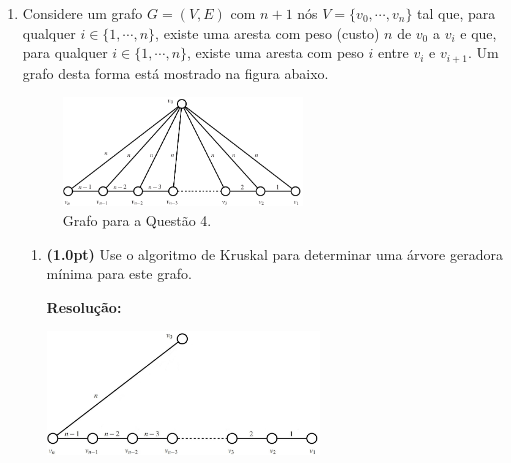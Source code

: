 \documentclass{article}
\begin{document}
\begin{enumerate}[resume*=exerc]
\item Considere um grafo $G = (V,E)$ com $n+1$ nós $V = \{v_0,\cdots,v_n\}$ tal que, para qualquer $i \in \{1,\cdots,n\}$, existe uma aresta com peso (custo) $n$ de $v_0$ a $v_i$ e que, para qualquer $i \in \{1,\cdots,n\}$, existe uma aresta com peso $i$ entre $v_i$ e $v_{i+1}$. Um grafo desta forma está mostrado na figura abaixo.

\begin{figure}[h]
\centering
\includegraphics[width=0.6\textwidth]{agm_p2}
\caption{Grafo para a Questão 4.} \label{fig1}
\end{figure}

\begin{enumerate}[label=(\alph*),series=q4]
\item {\bf (1.0pt)} Use o algoritmo de Kruskal para determinar uma árvore geradora mínima para este grafo.
\begin{framed}
{\bf Resolução:}
\begin{center}
    \includegraphics[width=0.6\textwidth]{4a.JPG}
\end{center}
\vspace{1cm}
\end{framed}


\end{enumerate}
\end{enumerate}
\end{document}
